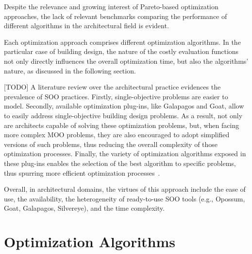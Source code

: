 	Despite the relevance and growing interest of Pareto-based optimization approaches, the lack of relevant benchmarks comparing the performance of different algorithms in the architectural field is evident. 

	Each optimization approach comprises different optimization algorithms. In the particular case of building design, the nature of the costly evaluation functions not only directly influences the overall optimization time, but also the algorithms' nature, as discussed in the following section. 
	
	
	[TODO]
	A literature review over the architectural practice evidences the prevalence of \ac{SOO} practices. Firstly, single-objective problems are easier to model. Secondly, available optimization plug-ins, like Galapagos and Goat, allow to easily address single-objective building design problems. As a result, not only are architects capable of solving these optimization problems, but, when facing more complex \ac{MOO} problems, they are also encouraged to adopt simplified versions of such problems, thus reducing the overall complexity of those optimization processes. Finally, the variety of optimization algorithms exposed in these plug-ins enables the selection of the best algorithm to specific problems, thus spurring more efficient optimization processes~\cite{Wortmann2016BBO}.  
	
	Overall, in architectural domains, the virtues of this approach include the ease of use, the availability, the heterogeneity of ready-to-use \ac{SOO} tools (e.g., Opossum, Goat, Galapagos, Silvereye), and the time complexity. %

\section{Optimization Algorithms}
\label{sec:optimizationalgorithms}
	
